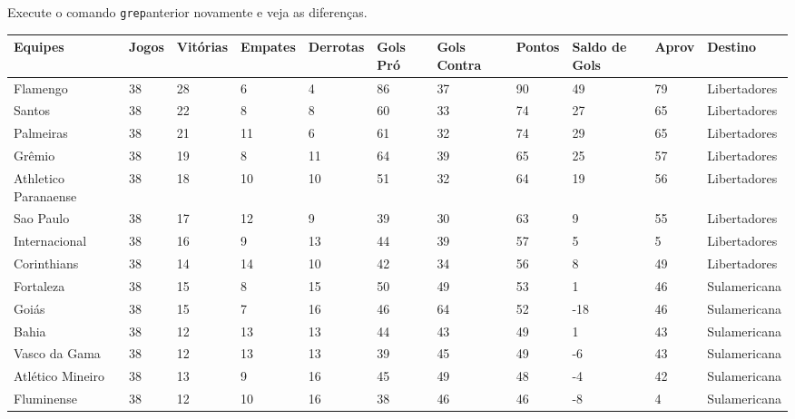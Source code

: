 \documentclass[
]{book}
\newenvironment{Shaded}{\begin{snugshade}}{\end{snugshade}}
\newcommand{\CommentTok}[1]{\textcolor[rgb]{0.56,0.35,0.01}{\textit{#1}}}
\newcommand{\DecValTok}[1]{\textcolor[rgb]{0.00,0.00,0.81}{#1}}
\newcommand{\FloatTok}[1]{\textcolor[rgb]{0.00,0.00,0.81}{#1}}
\newcommand{\NormalTok}[1]{#1}
\newcommand{\OtherTok}[1]{\textcolor[rgb]{0.56,0.35,0.01}{#1}}
\newcommand{\SpecialCharTok}[1]{\textcolor[rgb]{0.00,0.00,0.00}{#1}}
\newcommand{\StringTok}[1]{\textcolor[rgb]{0.31,0.60,0.02}{#1}}
\begin{document}
\begin{Shaded}
\end{Shaded}

Execute o comando \texttt{grep}anterior novamente e veja as diferenças.

\begin{table}
\centering\begingroup\fontsize{11.5}{13.5}\selectfont

\begin{tabular}{l|l|l|l|l|l|l|l|l|l|l}
\hline
Equipes & Jogos & Vitórias & Empates & Derrotas & Gols Pró & Gols Contra & Pontos & Saldo de Gols & Aprov  & Destino\\
\hline
Flamengo & 38 & 28 & 6 & 4 & 86 & 37 & 90 & 49 & 79 & Libertadores\\
\hline
Santos & 38 & 22 & 8 & 8 & 60 & 33 & 74 & 27 & 65 & Libertadores\\
\hline
Palmeiras & 38 & 21 & 11 & 6 & 61 & 32 & 74 & 29 & 65 & Libertadores\\
\hline
Grêmio & 38 & 19 & 8 & 11 & 64 & 39 & 65 & 25 & 57 & Libertadores\\
\hline
Athletico Paranaense & 38 & 18 & 10 & 10 & 51 & 32 & 64 & 19 & 56 & Libertadores\\
\hline
Sao Paulo & 38 & 17 & 12 & 9 & 39 & 30 & 63 & 9 & 55 & Libertadores\\
\hline
Internacional & 38 & 16 & 9 & 13 & 44 & 39 & 57 & 5 & 5 & Libertadores\\
\hline
Corinthians & 38 & 14 & 14 & 10 & 42 & 34 & 56 & 8 & 49 & Libertadores\\
\hline
Fortaleza & 38 & 15 & 8 & 15 & 50 & 49 & 53 & 1 & 46 & Sulamericana\\
\hline
Goiás & 38 & 15 & 7 & 16 & 46 & 64 & 52 & -18 & 46 & Sulamericana\\
\hline
Bahia & 38 & 12 & 13 & 13 & 44 & 43 & 49 & 1 & 43 & Sulamericana\\
\hline
Vasco da Gama & 38 & 12 & 13 & 13 & 39 & 45 & 49 & -6 & 43 & Sulamericana\\
\hline
Atlético Mineiro & 38 & 13 & 9 & 16 & 45 & 49 & 48 & -4 & 42 & Sulamericana\\
\hline
Fluminense & 38 & 12 & 10 & 16 & 38 & 46 & 46 & -8 & 4 & Sulamericana\\

\end{tabular}
\end{table}
\end{document}
